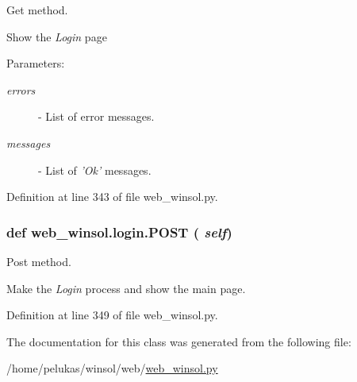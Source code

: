 Get method. 

Show the {\em Login\/} page

\begin{Desc}
\item[Parameters:]
\begin{description}
\item[{\em errors}]- List of error messages. \item[{\em messages}]- List of {\em 'Ok'\/} messages. \end{description}
\end{Desc}


Definition at line 343 of file web\_\-winsol.py.\hypertarget{classweb__winsol_1_1login_86611f380550c61c4f03662a0fb88594}{
\subsubsection[POST]{\setlength{\rightskip}{0pt plus 5cm}def web\_\-winsol.login.POST ( {\em self})}}
\label{classweb__winsol_1_1login_86611f380550c61c4f03662a0fb88594}


Post method. 

Make the {\em Login\/} process and show the main page. 

Definition at line 349 of file web\_\-winsol.py.

The documentation for this class was generated from the following file:\begin{CompactItemize}
\item 
/home/pelukas/winsol/web/\hyperlink{web__winsol_8py}{web\_\-winsol.py}\end{CompactItemize}
